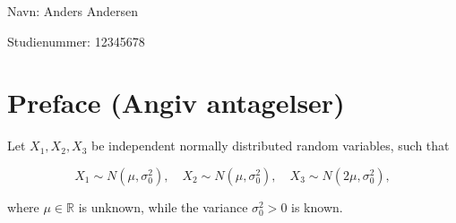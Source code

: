 \documentclass{article}
\begin{document}
{\LARGE Navn: Anders Andersen\par}
\vspace{2em}

{\LARGE Studienummer: 12345678\par}
\vspace{2em}

\section*{Preface (Angiv antagelser)}



Let \( X_1, X_2, X_3 \) be independent normally distributed random variables, such that

\[
X_1 \sim N(\mu, \sigma_0^2), \quad X_2 \sim N(\mu, \sigma_0^2), \quad X_3 \sim N(2\mu, \sigma_0^2),
\]

where \( \mu \in \mathbb{R} \) is unknown, while the variance \( \sigma_0^2 > 0 \) is known.
\end{document}
